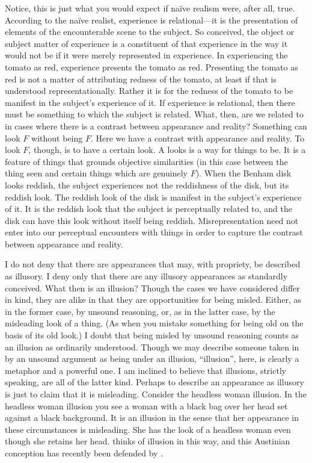 \documentclass[12pt]{article}
\begin{document}
Notice, this is just what you would expect if naïve realism were, after all, true. According to the naïve realist, experience is relational---it is the presentation of elements of the encounterable scene to the subject. So conceived, the object or subject matter of experience is a constituent of that experience in the way it would not be if it were merely represented in experience. In experiencing the tomato as red, experience presents the tomato as red. Presenting the tomato as red is not a matter of attributing redness of the tomato, at least if that is understood representationally. Rather it is for the redness of the tomato to be manifest in the subject's experience of it. If experience is relational, then there must be something to which the subject is related. What, then, are we related to in cases where there is a contrast between appearance and reality? Something can look \( F \) without being \( F \). Here we have a contrast with appearance and reality. To look \( F \), though, is to have a certain look. A looks is a way for things to be. It is a feature of things that grounds objective similarities (in this case between the thing seen and certain things which are genuinely \( F \)). When the Benham disk looks reddish, the subject experiences not the reddishness of the disk, but its reddish look. The reddish look of the disk is manifest in the subject's experience of it. It is the reddish look that the subject is perceptually related to, and the disk can have this look without itself being reddish. Misrepresentation need not enter into our perceptual encounters with things in order to capture the contrast between appearance and reality.

I do not deny that there are appearances that may, with propriety, be described as illusory. I deny only that there are any illusory appearances as standardly conceived. What then is an illusion? Though the cases we have considered differ in kind, they are alike in that they are opportunities for being misled. Either, as in the former case, by unsound reasoning, or, as in the latter case, by the misleading look of a thing. (As when you mistake something for being old on the basis of its old look.) I doubt that being misled by unsound reasoning counts as an illusion as ordinarily understood. Though we may describe someone taken in by an unsound argument as being under an illusion, ``illusion'', here, is clearly a metaphor and a powerful one. I am inclined to believe that illusions, strictly speaking, are all of the latter kind. Perhaps to describe an appearance as illusory is just to claim that it is misleading. Consider the headless woman illusion. In the headless woman illusion you see a woman with a black bag over her head set against a black background. It is an illusion in the sense that her appearance in these circumstances is misleading. She has the look of a headless woman even though she retains her head. \citet{Austin:1962lr} thinks of illusion in this way, and this Austinian conception has recently been defended by \citet[68]{Travis:2004kx} \citep[for a similar recent account see][]{Brewer:2008fv}.
\end{document}
